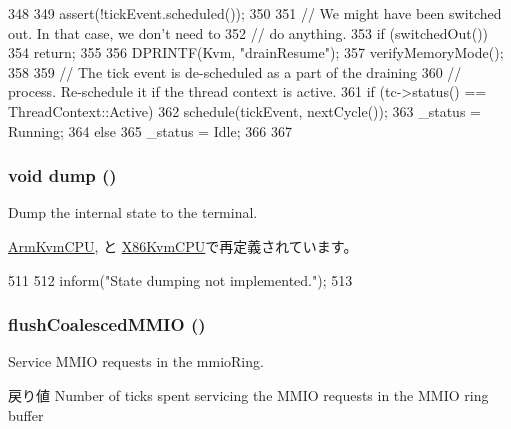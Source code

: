 \begin{DoxyCode}
348 {
349     assert(!tickEvent.scheduled());
350 
351     // We might have been switched out. In that case, we don't need to
352     // do anything.
353     if (switchedOut())
354         return;
355 
356     DPRINTF(Kvm, "drainResume\n");
357     verifyMemoryMode();
358 
359     // The tick event is de-scheduled as a part of the draining
360     // process. Re-schedule it if the thread context is active.
361     if (tc->status() == ThreadContext::Active) {
362         schedule(tickEvent, nextCycle());
363         _status = Running;
364     } else {
365         _status = Idle;
366     }
367 }
\end{DoxyCode}
\hypertarget{classBaseKvmCPU_accd2600060dbaee3a3b41aed4034c63c}{
\subsubsection[{dump}]{\setlength{\rightskip}{0pt plus 5cm}void dump ()}}
\label{classBaseKvmCPU_accd2600060dbaee3a3b41aed4034c63c}
Dump the internal state to the terminal. 

\hyperlink{classArmKvmCPU_accd2600060dbaee3a3b41aed4034c63c}{ArmKvmCPU}, と \hyperlink{classX86KvmCPU_accd2600060dbaee3a3b41aed4034c63c}{X86KvmCPU}で再定義されています。


\begin{DoxyCode}
511 {
512     inform("State dumping not implemented.");
513 }
\end{DoxyCode}
\hypertarget{classBaseKvmCPU_a2858df681aa95b652e3d371d56def5a3}{
\subsubsection[{flushCoalescedMMIO}]{ flushCoalescedMMIO ()}}
\label{classBaseKvmCPU_a2858df681aa95b652e3d371d56def5a3}
Service MMIO requests in the mmioRing.

\begin{DoxyReturn}{戻り値}
Number of ticks spent servicing the MMIO requests in the MMIO ring buffer 
\end{DoxyReturn}



